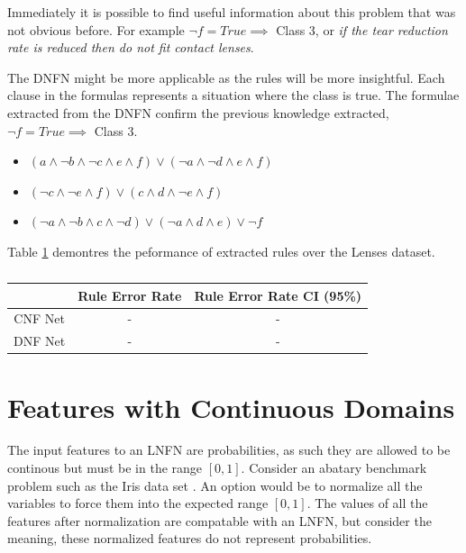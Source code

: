Immediately it is possible to find useful information about this problem that was not obvious before. For example $\lnot f = True \implies $ Class 3, or \textit{if the tear reduction rate is reduced then do not fit contact lenses}.



The DNFN might be more applicable as the rules will be more insightful. Each clause in the formulas represents a situation where the class is true. The formulae extracted from the DNFN confirm the previous knowledge extracted, $\lnot f = True \implies $ Class 3.

\begin{itemize}
	\item {} $(a \land \lnot b \land \lnot c \land e \land f) \lor (\lnot a \land \lnot d \land e \land f)$
	\item {} $(\lnot c \land \lnot e \land f) \lor (c \land d \land \lnot e \land f)$
	\item {} $(\lnot a \land \lnot b \land c \land \lnot d) \lor (\lnot a \land d \land e) \lor \lnot f$
\end{itemize}

Table \ref{tab:lenses-rule-peformance-comp} demontres the peformance of extracted rules over the Lenses dataset.

\begin{table}[H]
	\begin{center}
		\begin{tabular}{| c | c | c |}
			\hline
			& Rule Error Rate & Rule Error Rate CI (95\%) \\
			\hline
			\hline
			CNF Net & - & - \\
			\hline
			DNF Net & - & - \\
			\hline
		\end{tabular}
	\end{center}
	\caption{}
	\label{tab:lenses-rule-peformance-comp}
\end{table}

\section{Features with Continuous Domains}
The input features to an LNFN are probabilities, as such they are allowed to be continous but must be in the range $[0, 1]$. Consider an abatary benchmark problem such as the Iris data set \cite{Lichman:2013}. An option would be to normalize all the variables to force them into the expected range $[0,1]$. The values of all the features after normalization are compatable with an LNFN, but consider the meaning, these normalized features do not represent probabilities.\\

